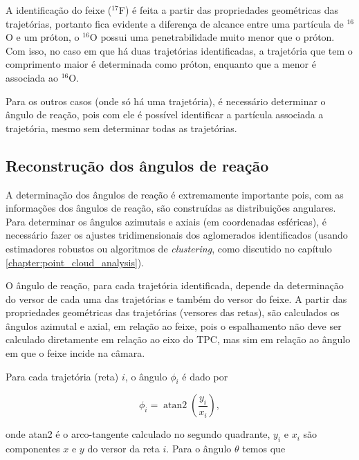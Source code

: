 \documentclass[a4paper,12pt,oneside]{book}
\DeclareMathOperator{\atantwo}{atan2}
\begin{document}
\par A identificação do feixe ($^{17}$F) é feita a partir das propriedades geométricas das trajetórias, portanto fica evidente a diferença de alcance entre uma partícula de $^{16}$O e um próton, o $^{16}$O possui uma penetrabilidade muito menor que o próton. Com isso, no caso em que há duas trajetórias identificadas, a trajetória que tem o comprimento maior é determinada como próton, enquanto que a menor é associada ao $^{16}$O.

\par Para os outros casos (onde só há uma trajetória), é necessário determinar o ângulo de reação, pois com ele é possível identificar a partícula associada a trajetória, mesmo sem determinar todas as trajetórias.

\subsection{Reconstrução dos ângulos de reação}

\par A determinação dos ângulos de reação é extremamente importante pois, com as informações dos ângulos de reação, são construídas as distribuições angulares. Para determinar os ângulos azimutais e axiais (em coordenadas esféricas), é necessário fazer os ajustes tridimensionais dos aglomerados identificados (usando estimadores robustos ou algoritmos de \textit{clustering}, como discutido no capítulo \ref{chapter:point_cloud_analysis}).

\par O ângulo de reação, para cada trajetória identificada, depende da determinação do versor de cada uma das trajetórias e também do versor do feixe. A partir das propriedades geométricas das trajetórias (versores das retas), são calculados os ângulos azimutal e axial, em relação ao feixe, pois o espalhamento não deve ser calculado diretamente em relação ao eixo do TPC, mas sim em relação ao ângulo em que o feixe incide na câmara.

\par Para cada trajetória (reta) $i$, o ângulo $\phi_i$ é dado por

\begin{equation}
	\phi_i = \atantwo \left (\frac{y_i}{x_i} \right),
\end{equation}

\par onde atan2 é o arco-tangente calculado no segundo quadrante, $y_i$ e $x_i$ são componentes $x$ e $y$ do versor da reta $i$. Para o ângulo $\theta$ temos que
\end{document}

